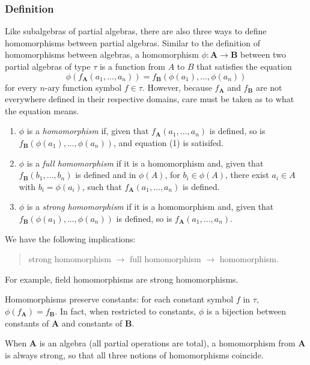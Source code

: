 \documentclass[12pt]{article}
\begin{document}
\subsubsection*{Definition}

Like subalgebras of partial algebras, there are also three ways to define homomorphisms between partial algebras.  Similar to the definition of homomorphisms between algebras, a homomorphism $\phi: \boldsymbol{A}\to \boldsymbol{B}$ between two partial algebras of type $\tau$ is a function from $A$ to $B$ that satisfies the equation 
\begin{equation}
\phi(f_{\boldsymbol{A}}(a_1,\ldots, a_n))= f_{\boldsymbol{B}}(\phi(a_1),\ldots, \phi(a_n))
\end{equation}
for every $n$-ary function symbol $f\in \tau$.  However, because $f_{\boldsymbol{A}}$ and $f_{\boldsymbol{B}}$ are not everywhere defined in their respective domains, care must be taken as to what the equation means.
\begin{enumerate}
\item $\phi$ is a \emph{homomorphism} if, given that $f_{\boldsymbol{A}}(a_1,\ldots, a_n)$ is defined, so is $f_{\boldsymbol{B}}(\phi(a_1),\ldots, \phi(a_n))$, and equation (1) is satisifed.
\item $\phi$ is a \emph{full homomorphism} if it is a homomorphism and, given that $f_{\boldsymbol{B}}(b_1,\ldots, b_n)$ is defined and in $\phi(A)$, for $b_i\in \phi(A)$, there exist $a_i\in A$ with $b_i=\phi(a_i)$, such that $f_{\boldsymbol{A}}(a_1,\ldots, a_n)$ is defined.
\item $\phi$ is a \emph{strong homomorphism} if it is a homomorphism and, given that $f_{\boldsymbol{B}}(\phi(a_1),\ldots, \phi(a_n))$ is defined, so is $f_{\boldsymbol{A}}(a_1,\ldots, a_n)$.
\end{enumerate}

We have the following implications: 
\begin{quote}
strong homomorphism $\rightarrow$ full homomorphism $\rightarrow$ homomorphism.
\end{quote}
For example, field homomorphisms are strong homomorphisms.

Homomorphisms preserve constants: for each constant symbol $f$ in $\tau$, $\phi(f_{\boldsymbol{A}}) = f_{\boldsymbol{B}}$.  In fact, when restricted to constants, $\phi$ is a bijection between constants of $\boldsymbol{A}$ and constants of $\boldsymbol{B}$.

When $\boldsymbol{A}$ is an algebra (all partial operations are total), a homomorphism from $\boldsymbol{A}$ is always strong, so that all three notions of homomorphisms coincide.
\end{document}

